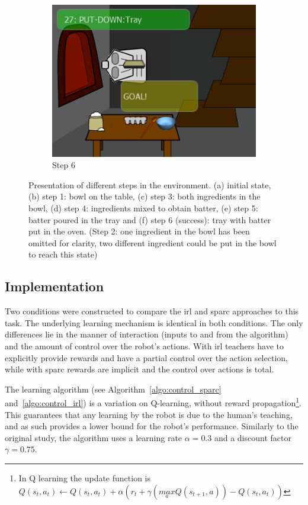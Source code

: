 \begin{figure}[ht]
\begin{subfigure}[b]{0.325\textwidth}
		\includegraphics[width=\textwidth]{step6.png}
		\caption{Step 6}
		\label{fig:control_goal}
	\end{subfigure}
	
	\caption{Presentation of different steps in the environment. (a) initial state, (b) step 1: bowl on the table, (c) step 3: both ingredients in the bowl, (d) step 4: ingredients mixed to obtain batter, (e) step 5: batter poured in the tray and (f) step 6 (success): tray with batter put in the oven. (Step 2: one ingredient in the bowl has been omitted for clarity, two different ingredient could be put in the bowl to reach this state)}
	\label{fig:control_states}
\end{figure}

\subsection{Implementation}

Two conditions were constructed to compare the \gls{irl} and \gls{sparc} approaches to this task. The underlying learning mechanism is identical in both conditions. The only differences lie in the manner of interaction (inputs to and from the algorithm) and the amount of control over the robot's actions. With \gls{irl} teachers have to explicitly provide rewards and have a partial control over the action selection, while with \gls{sparc} rewards are implicit and the control over actions is total. 

The learning algorithm (see Algorithm~\ref{algo:control_sparc} and~\ref{algo:control_irl}) is a variation on Q-learning, without reward propagation\footnote{In Q learning the update function is $Q(s_{t},a_{t}) \leftarrow Q(s_{t},a_{t}) + \alpha (r_{t}+\gamma (\underset{a}{max} Q(s_{t+1},a))-Q(s_{t},a_{t}))$}. This guarantees that any learning by the robot is due to the human's teaching, and as such provides a lower bound for the robot's performance. %
Similarly to the original study, the algorithm uses a learning rate $\alpha = 0.3$ and a discount factor $\gamma = 0.75$.

